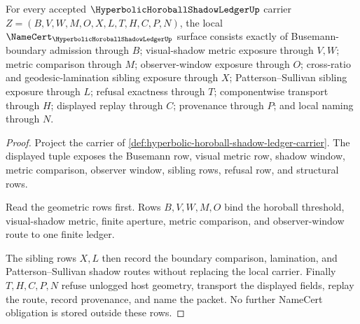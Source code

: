\begin{theorem}
\label{thm:hyperbolic-horoball-shadow-ledger-namecert-obligations}
For every accepted $\HyperbolicHoroballShadowLedgerUp$ carrier $Z=(B,V,W,M,O,X,L,T,H,C,P,N)$, the local $\NameCert_{\HyperbolicHoroballShadowLedgerUp}$ surface consists exactly of Busemann-boundary admission through $B$; visual-shadow metric exposure through $V,W$; metric comparison through $M$; observer-window exposure through $O$; cross-ratio and geodesic-lamination sibling exposure through $X$; Patterson--Sullivan sibling exposure through $L$; refusal exactness through $T$; componentwise transport through $H$; displayed replay through $C$; provenance through $P$; and local naming through $N$.
\end{theorem}
\begin{proof}
Project the carrier of \autoref{def:hyperbolic-horoball-shadow-ledger-carrier}. The displayed tuple exposes the Busemann row, visual metric row, shadow window, metric comparison, observer window, sibling rows, refusal row, and structural rows.

Read the geometric rows first. Rows $B,V,W,M,O$ bind the horoball threshold, visual-shadow metric, finite aperture, metric comparison, and observer-window route to one finite ledger.

The sibling rows $X,L$ then record the boundary comparison, lamination, and Patterson--Sullivan shadow routes without replacing the local carrier. Finally $T,H,C,P,N$ refuse unlogged host geometry, transport the displayed fields, replay the route, record provenance, and name the packet. No further NameCert obligation is stored outside these rows.
\end{proof}

